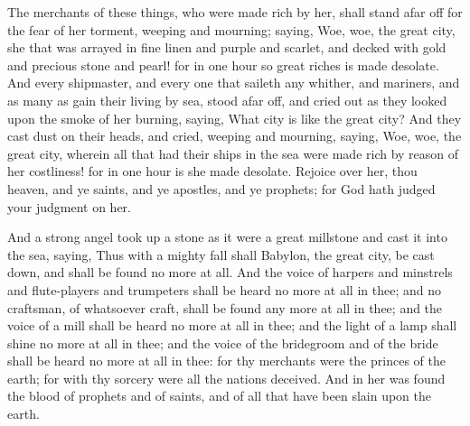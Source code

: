  The merchants of these things, who were made rich by her, shall stand afar off for the fear of her torment, weeping and mourning; 
 saying, Woe, woe, the great city, she that was arrayed in fine linen and purple and scarlet, and decked with gold and precious stone and pearl! 
 for in one hour so great riches is made desolate. And every shipmaster, and every one that saileth any whither, and mariners, and as many as gain their living by sea, stood afar off, 
 and cried out as they looked upon the smoke of her burning, saying, What city is like the great city? 
 And they cast dust on their heads, and cried, weeping and mourning, saying, Woe, woe, the great city, wherein all that had their ships in the sea were made rich by reason of her costliness! for in one hour is she made desolate. 
 Rejoice over her, thou heaven, and ye saints, and ye apostles, and ye prophets; for God hath judged your judgment on her.

 And a strong angel took up a stone as it were a great millstone and cast it into the sea, saying, Thus with a mighty fall shall Babylon, the great city, be cast down, and shall be found no more at all. 
 And the voice of harpers and minstrels and flute-players and trumpeters shall be heard no more at all in thee; and no craftsman, of whatsoever craft, shall be found any more at all in thee; and the voice of a mill shall be heard no more at all in thee; 
 and the light of a lamp shall shine no more at all in thee; and the voice of the bridegroom and of the bride shall be heard no more at all in thee: for thy merchants were the princes of the earth; for with thy sorcery were all the nations deceived. 
 And in her was found the blood of prophets and of saints, and of all that have been slain upon the earth.